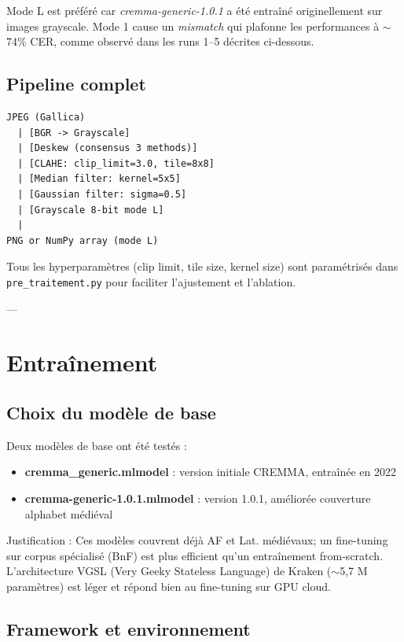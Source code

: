﻿\documentclass[twoside,twocolumn,10pt]{article}
\begin{document}
Mode L est préféré car \textit{cremma-generic-1.0.1} a été entraîné originellement sur images grayscale. Mode 1 cause un \textit{mismatch} qui plafonne les performances à $\sim$74\% CER, comme observé dans les runs 1--5 décrites ci-dessous.

\subsection{Pipeline complet}

\begin{verbatim}
JPEG (Gallica) 
  | [BGR -> Grayscale]
  | [Deskew (consensus 3 methods)]
  | [CLAHE: clip_limit=3.0, tile=8x8]
  | [Median filter: kernel=5x5]
  | [Gaussian filter: sigma=0.5]
  | [Grayscale 8-bit mode L]
  |
PNG or NumPy array (mode L)
\end{verbatim}

Tous les hyperparamètres (clip limit, tile size, kernel size) sont paramétrisés dans \texttt{pre\_traitement.py} pour faciliter l'ajustement et l'ablation.

---

\section{Entraînement}
\fontsize{11}{13}\selectfont
\justifying

\subsection{Choix du modèle de base}

Deux modèles de base ont été testés :

\begin{itemize}
  \item \textbf{cremma\_generic.mlmodel} \cite{zenodo7234166} : version initiale CREMMA, entraînée en 2022
  \item \textbf{cremma-generic-1.0.1.mlmodel} \cite{zenodo7631619} : version 1.0.1, améliorée couverture alphabet médiéval
\end{itemize}

Justification : Ces modèles couvrent déjà AF et Lat. médiévaux; un fine-tuning sur corpus spécialisé (BnF) est plus efficient qu'un entraînement from-scratch. L'architecture VGSL (Very Geeky Stateless Language) de Kraken \cite{vgsl2017} ($\sim$5,7 M paramètres) est léger et répond bien au fine-tuning sur GPU cloud.

\subsection{Framework et environnement}
\end{document}
